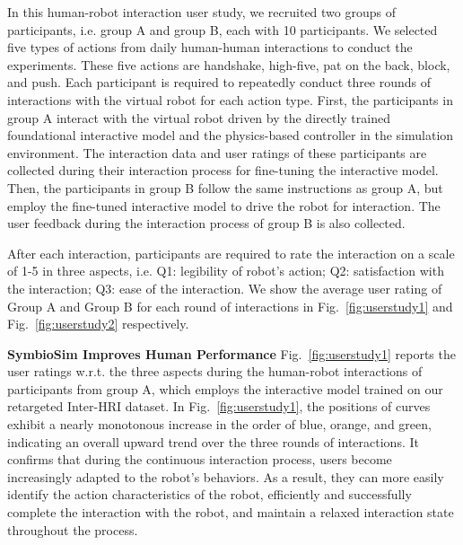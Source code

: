 In this human-robot interaction user study, we recruited two groups of participants, i.e. group A and group B, each with 10 participants. We selected five types of actions from daily human-human interactions to conduct the experiments. These five actions are handshake, high-five, pat on the back, block, and push.
Each participant is required to repeatedly conduct three rounds of interactions with the virtual robot for each action type. First, the participants in group A interact with the virtual robot driven by the directly trained foundational interactive model and the physics-based controller in the simulation environment. The interaction data and user ratings of these participants are collected during their interaction process for fine-tuning the interactive model. Then, the participants in group B follow the same instructions as group A, but employ the fine-tuned interactive model to drive the robot for interaction. The user feedback during the interaction process of group B is also collected.

After each interaction, participants are required to rate the interaction on a scale of 1-5 in three aspects, i.e. Q1: legibility of robot's action; Q2: satisfaction with the interaction; Q3: ease of the interaction. %
We show the average user rating of Group A and Group B for each round of interactions in Fig.~\ref{fig:userstudy1} and Fig.~\ref{fig:userstudy2} respectively. %


\textbf{SymbioSim Improves Human Performance} Fig.~\ref{fig:userstudy1} reports the user ratings w.r.t. the three aspects during the human-robot interactions of participants from group A, which employs the interactive model trained on our retargeted Inter-HRI dataset. %
In Fig.~\ref{fig:userstudy1}, the positions of curves exhibit a nearly monotonous increase in the order of blue, orange, and green, indicating an overall upward trend over the three rounds of interactions. It confirms that during the continuous interaction process, users become increasingly adapted to the robot's behaviors. As a result, they can more easily identify the action characteristics of the robot, efficiently and successfully complete the interaction with the robot, and maintain a relaxed interaction state throughout the process.

